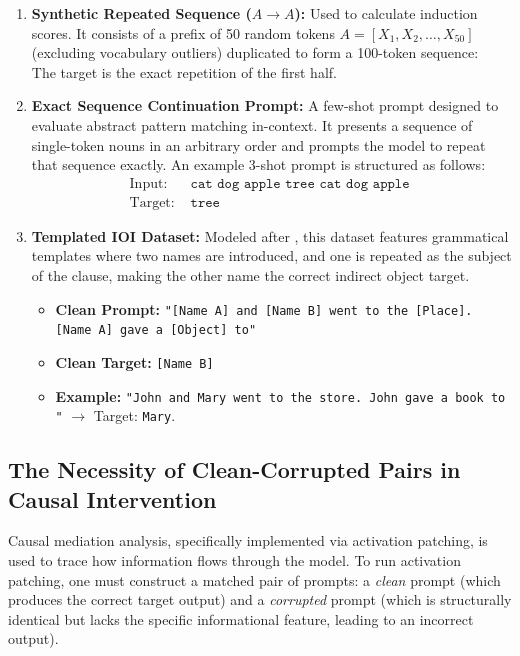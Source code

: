 \documentclass[11pt]{article}
\begin{document}
\begin{enumerate}
    \item \textbf{Synthetic Repeated Sequence ($A \rightarrow A$):} Used to calculate induction scores. It consists of a prefix of 50 random tokens $A = [X_1, X_2, \dots, X_{50}]$ (excluding vocabulary outliers) duplicated to form a 100-token sequence:
    \begin{equation}
        [X_1, X_2, \dots, X_{50}, X_1, X_2, \dots, X_{50}]
    \end{equation}
    The target is the exact repetition of the first half.
    \item \textbf{Exact Sequence Continuation Prompt:} A few-shot prompt designed to evaluate abstract pattern matching in-context. It presents a sequence of single-token nouns in an arbitrary order and prompts the model to repeat that sequence exactly.
    An example 3-shot prompt is structured as follows:
    \begin{align*}
        \text{Input: } & \texttt{cat dog apple tree cat dog apple } \\
        \text{Target: } & \texttt{tree}
    \end{align*}
    \item \textbf{Templated IOI Dataset:} Modeled after \citet{wang2022}, this dataset features grammatical templates where two names are introduced, and one is repeated as the subject of the clause, making the other name the correct indirect object target.
    \begin{itemize}
        \item \textbf{Clean Prompt:} \texttt{"[Name A] and [Name B] went to the [Place]. [Name A] gave a [Object] to"}
        \item \textbf{Clean Target:} \texttt{[Name B]}
        \item \textbf{Example:} \texttt{"John and Mary went to the store. John gave a book to "} $\rightarrow$ Target: \texttt{Mary}.
    \end{itemize}
\end{enumerate}

\subsection{The Necessity of Clean-Corrupted Pairs in Causal Intervention}

Causal mediation analysis, specifically implemented via activation patching, is used to trace how information flows through the model. To run activation patching, one must construct a matched pair of prompts: a \textit{clean} prompt (which produces the correct target output) and a \textit{corrupted} prompt (which is structurally identical but lacks the specific informational feature, leading to an incorrect output). 
\end{document}
